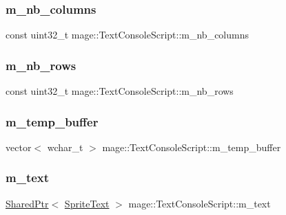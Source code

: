 \subsubsection{\texorpdfstring{m\+\_\+nb\+\_\+columns}{m\_nb\_columns}}
{\footnotesize\ttfamily const uint32\+\_\+t mage\+::\+Text\+Console\+Script\+::m\+\_\+nb\+\_\+columns\hspace{0.3cm}{\ttfamily [private]}}

\hypertarget{classmage_1_1_text_console_script_ac2e2d9630355f22945259d5a0af135ef}{}\label{classmage_1_1_text_console_script_ac2e2d9630355f22945259d5a0af135ef} 
\subsubsection{\texorpdfstring{m\+\_\+nb\+\_\+rows}{m\_nb\_rows}}
{\footnotesize\ttfamily const uint32\+\_\+t mage\+::\+Text\+Console\+Script\+::m\+\_\+nb\+\_\+rows\hspace{0.3cm}{\ttfamily [private]}}

\hypertarget{classmage_1_1_text_console_script_a6500bfd006f5c90d05f3da7f3e8e75a8}{}\label{classmage_1_1_text_console_script_a6500bfd006f5c90d05f3da7f3e8e75a8} 
\subsubsection{\texorpdfstring{m\+\_\+temp\+\_\+buffer}{m\_temp\_buffer}}
{\footnotesize\ttfamily vector$<$ wchar\+\_\+t $>$ mage\+::\+Text\+Console\+Script\+::m\+\_\+temp\+\_\+buffer\hspace{0.3cm}{\ttfamily [private]}}

\hypertarget{classmage_1_1_text_console_script_a761287353d8f9b031beb890c9f6c7203}{}\label{classmage_1_1_text_console_script_a761287353d8f9b031beb890c9f6c7203} 
\subsubsection{\texorpdfstring{m\+\_\+text}{m\_text}}
{\footnotesize\ttfamily \hyperlink{namespacemage_a1e01ae66713838a7a67d30e44c67703e}{Shared\+Ptr}$<$ \hyperlink{classmage_1_1_sprite_text}{Sprite\+Text} $>$ mage\+::\+Text\+Console\+Script\+::m\+\_\+text\hspace{0.3cm}{\ttfamily [private]}}

